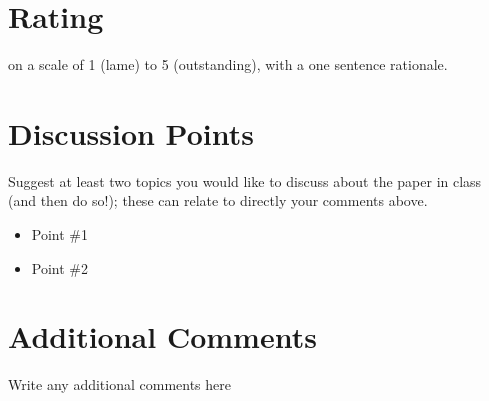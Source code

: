 \documentclass[sigconf]{acmart}
\begin{document}
\section{Rating}
on a scale of 1 (lame) to 5 (outstanding), with a one sentence rationale.

\section{Discussion Points}
Suggest at least two topics you would like to discuss about the paper in class (and then do so!); these can relate to directly your comments above. 
\begin{itemize}
    \item Point \#1
    \item Point \#2
\end{itemize}

\section{Additional Comments}
Write any additional comments here
\end{document}
